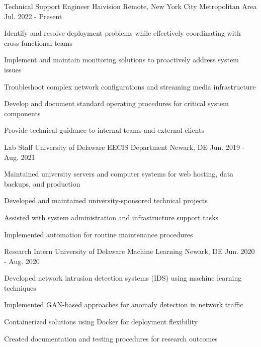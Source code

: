 \documentclass[11pt, a4paper]{awesome-cv}
\begin{document}
\begin{cventries}

  \cventry
    {Technical Support Engineer} %
    {Haivision} %
    {Remote, New York City Metropolitan Area} %
    {Jul. 2022 - Present} %
    {
      \begin{cvitems} %
        \item {Identify and resolve deployment problems while effectively coordinating with cross-functional teams}
        \item {Implement and maintain monitoring solutions to proactively address system issues}
        \item {Troubleshoot complex network configurations and streaming media infrastructure}
        \item {Develop and document standard operating procedures for critical system components}
        \item {Provide technical guidance to internal teams and external clients}
      \end{cvitems}
    }

  \cventry
    {Lab Staff}
    {University of Delaware EECIS Department}
    {Newark, DE}
    {Jun. 2019 - Aug. 2021}
    {
      \begin{cvitems}
        \item {Maintained university servers and computer systems for web hosting, data backups, and production}
        \item {Developed and maintained university-sponsored technical projects}
        \item {Assisted with system administration and infrastructure support tasks}
        \item {Implemented automation for routine maintenance procedures}
      \end{cvitems}
    }

  \cventry
    {Research Intern}
    {University of Delaware Machine Learning}
    {Newark, DE}
    {Jun. 2020 - Aug. 2020}
    {
      \begin{cvitems}
        \item {Developed network intrusion detection systems (IDS) using machine learning techniques}
        \item {Implemented GAN-based approaches for anomaly detection in network traffic}
        \item {Containerized solutions using Docker for deployment flexibility}
        \item {Created documentation and testing procedures for research outcomes}
      \end{cvitems}
    }


\end{cventries}
\end{document}
